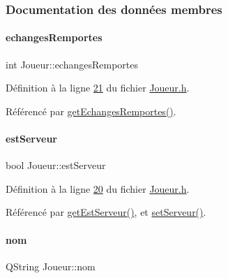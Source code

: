 \subsubsection{Documentation des données membres}
\mbox{\label{class_joueur_a23ab203e6bbfc1b2679a8457b99206dc}} 
\paragraph{\texorpdfstring{echanges\+Remportes}{echangesRemportes}}
{\footnotesize\ttfamily int Joueur\+::echanges\+Remportes\hspace{0.3cm}{\ttfamily [private]}}



Définition à la ligne \hyperlink{_joueur_8h_source_l00021}{21} du fichier \hyperlink{_joueur_8h_source}{Joueur.\+h}.



Référencé par \hyperlink{_joueur_8cpp_source_l00053}{get\+Echanges\+Remportes()}.

\mbox{\label{class_joueur_ac22161c9510ed38d6c65cdf6315737a5}} 
\paragraph{\texorpdfstring{est\+Serveur}{estServeur}}
{\footnotesize\ttfamily bool Joueur\+::est\+Serveur\hspace{0.3cm}{\ttfamily [private]}}



Définition à la ligne \hyperlink{_joueur_8h_source_l00020}{20} du fichier \hyperlink{_joueur_8h_source}{Joueur.\+h}.



Référencé par \hyperlink{_joueur_8cpp_source_l00043}{get\+Est\+Serveur()}, et \hyperlink{_joueur_8cpp_source_l00048}{set\+Serveur()}.

\mbox{\label{class_joueur_ab06d7f1e6b482299bb03919e0cd2166d}} 
\paragraph{\texorpdfstring{nom}{nom}}
{\footnotesize\ttfamily Q\+String Joueur\+::nom\hspace{0.3cm}{\ttfamily [private]}}



